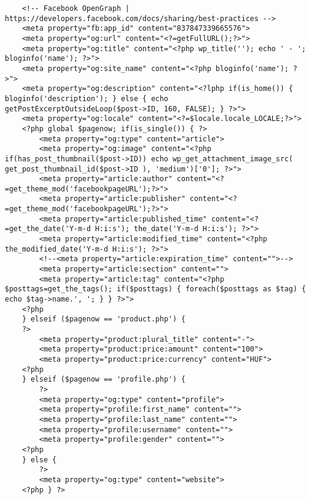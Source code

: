 
\begin{lstlisting}
	<!-- Facebook OpenGraph | https://developers.facebook.com/docs/sharing/best-practices -->
	<meta property="fb:app_id" content="837847339665576">
	<meta property="og:url" content="<?=getFullURL();?>">
	<meta property="og:title" content="<?php wp_title(''); echo ' - '; bloginfo('name'); ?>">
	<meta property="og:site_name" content="<?php bloginfo('name'); ?>">
	<meta property="og:description" content="<?lphp if(is_home()) { bloginfo('description'); } else { echo getPostExcerptOutsideLoop($post->ID, 160, FALSE); } ?>">
	<meta property="og:locale" content="<?=$locale.locale_LOCALE;?>">
	<?php global $pagenow; if(is_single()) { ?>
		<meta property="og:type" content="article">
		<meta property="og:image" content="<?php if(has_post_thumbnail($post->ID)) echo wp_get_attachment_image_src( get_post_thumbnail_id($post->ID ), 'medium')['0']; ?>">
		<meta property="article:author" content="<?=get_theme_mod('facebookpageURL');?>">
		<meta property="article:publisher" content="<?=get_theme_mod('facebookpageURL');?>">
		<meta property="article:published_time" content="<?=get_the_date('Y-m-d H:i:s'); the_date('Y-m-d H:i:s'); ?>">
		<meta property="article:modified_time" content="<?php the_modified_date('Y-m-d H:i:s'); ?>">
		<!--<meta property="article:expiration_time" content="">-->
		<meta property="article:section" content="">
		<meta property="article:tag" content="<?php $posttags=get_the_tags(); if($posttags) { foreach($posttags as $tag) { echo $tag->name.', '; } } ?>">
	<?php
	} elseif ($pagenow == 'product.php') {
	?>
		<meta property="product:plural_title" content="-">
		<meta property="product:price:amount" content="100">
		<meta property="product:price:currency" content="HUF">
	<?php
	} elseif ($pagenow == 'profile.php') {
		?>
		<meta property="og:type" content="profile">
		<meta property="profile:first_name" content="">
		<meta property="profile:last_name" content="">
		<meta property="profile:username" content="">
		<meta property="profile:gender" content="">
	<?php
	} else {
		?>
		<meta property="og:type" content="website">
	<?php } ?>
\end{lstlisting}

\newpage


